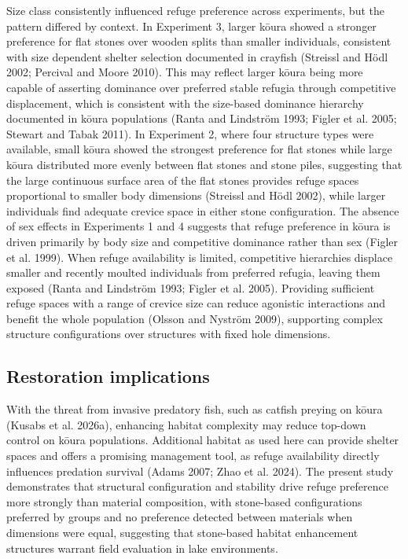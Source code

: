 \documentclass[
  12pt,
  a4paper,
  oneside]{scrbook}
\begin{document}
Size class consistently influenced refuge preference across experiments,
but the pattern differed by context. In Experiment 3, larger kōura
showed a stronger preference for flat stones over wooden splits than
smaller individuals, consistent with size dependent shelter selection
documented in crayfish (Streissl and Hödl 2002; Percival and Moore
2010). This may reflect larger kōura being more capable of asserting
dominance over preferred stable refugia through competitive
displacement, which is consistent with the size-based dominance
hierarchy documented in kōura populations (Ranta and Lindström 1993;
Figler et al. 2005; Stewart and Tabak 2011). In Experiment 2, where four
structure types were available, small kōura showed the strongest
preference for flat stones while large kōura distributed more evenly
between flat stones and stone piles, suggesting that the large
continuous surface area of the flat stones provides refuge spaces
proportional to smaller body dimensions (Streissl and Hödl 2002), while
larger individuals find adequate crevice space in either stone
configuration. The absence of sex effects in Experiments 1 and 4
suggests that refuge preference in kōura is driven primarily by body
size and competitive dominance rather than sex (Figler et al. 1999).
When refuge availability is limited, competitive hierarchies displace
smaller and recently moulted individuals from preferred refugia, leaving
them exposed (Ranta and Lindström 1993; Figler et al. 2005). Providing
sufficient refuge spaces with a range of crevice size can reduce
agonistic interactions and benefit the whole population (Olsson and
Nyström 2009), supporting complex structure configurations over
structures with fixed hole dimensions.

\subsection{Restoration implications}\label{restoration-implications}

With the threat from invasive predatory fish, such as catfish preying on
kōura (Kusabs et al. 2026a), enhancing habitat complexity may reduce
top-down control on kōura populations. Additional habitat as used here
can provide shelter spaces and offers a promising management tool, as
refuge availability directly influences predation survival (Adams 2007;
Zhao et al. 2024). The present study demonstrates that structural
configuration and stability drive refuge preference more strongly than
material composition, with stone-based configurations preferred by
groups and no preference detected between materials when dimensions were
equal, suggesting that stone-based habitat enhancement structures
warrant field evaluation in lake environments.
\end{document}
